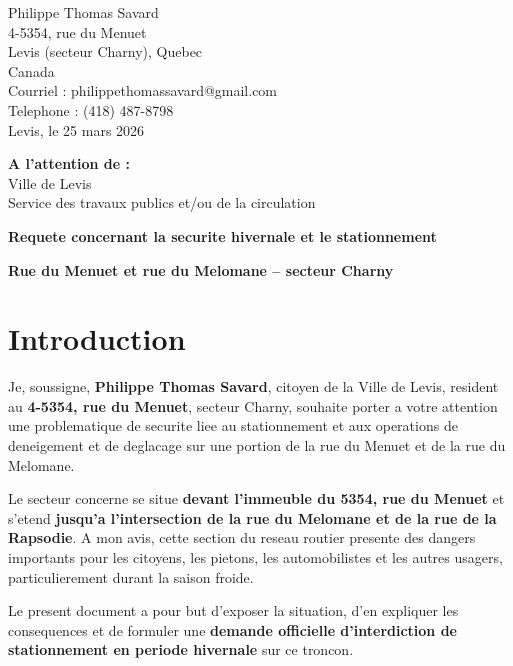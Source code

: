 \documentclass[11pt,a4paper]{article}
\begin{document}
\begin{flushright}
Philippe Thomas Savard\\
4-5354, rue du Menuet\\
Levis (secteur Charny), Quebec\\
Canada\\
Courriel : philippethomassavard@gmail.com\\
Telephone : (418) 487-8798\\
Levis, le 25 mars 2026
\end{flushright}

\vspace{1cm}


\noindent
\textbf{A l'attention de :}\\
Ville de Levis\\
Service des travaux publics et/ou de la circulation

\vspace{0.5cm}

\begin{center}
\Large\textbf{Requete concernant la securite hivernale et le stationnement}\


\large\textbf{Rue du Menuet et rue du Melomane -- secteur Charny}
\end{center}

\vspace{0.8cm}

\section*{Introduction}

Je, soussigne, \textbf{Philippe Thomas Savard}, citoyen de la Ville de Levis, resident au \textbf{4-5354, rue du Menuet}, secteur Charny, souhaite porter a votre attention une problematique de securite liee au stationnement et aux operations de deneigement et de deglacage sur une portion de la rue du Menuet et de la rue du Melomane.

Le secteur concerne se situe \textbf{devant l'immeuble du 5354, rue du Menuet} et s'etend \textbf{jusqu'a l'intersection de la rue du Melomane et de la rue de la Rapsodie}. A mon avis, cette section du reseau routier presente des dangers importants pour les citoyens, les pietons, les automobilistes et les autres usagers, particulierement durant la saison froide.

Le present document a pour but d'exposer la situation, d'en expliquer les consequences et de formuler une \textbf{demande officielle d'interdiction de stationnement en periode hivernale} sur ce troncon.
\end{document}
